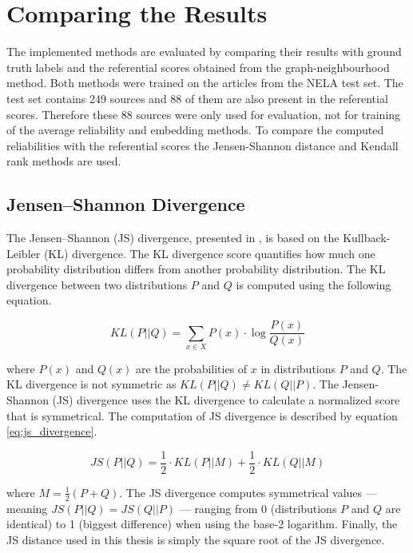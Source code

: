 \section{Comparing the Results}
The implemented methods are evaluated by comparing their results with ground truth labels and the referential scores obtained from the graph-neighbourhood method. Both methods were trained on the articles from the NELA test set. The test set contains 249 sources and 88 of them are also present in the referential scores. Therefore these 88 sources were only used for evaluation, not for training of the average reliability and embedding methods. To compare the computed reliabilities with the referential scores the Jensen-Shannon distance and Kendall rank methods are used. 

\subsection*{Jensen–Shannon Divergence}
The Jensen–Shannon (JS) divergence, presented in \cite{js_divergence}, is based on the Kullback-Leibler (KL) divergence. The KL divergence score quantifies how much one probability distribution differs from another probability distribution. The KL divergence between two distributions $P$ and $Q$ is computed using the following equation.

\begin{equation}
    KL(P || Q) = \sum_{x \in X} P(x) \cdot \operatorname{log}\frac{P(x)}{Q(x)}
    \label{eq:kl_divergence}
\end{equation}

where $P(x)$ and $Q(x)$ are the probabilities of $x$ in distributions $P$ and $Q$. The KL divergence is not symmetric as $KL(P||Q) \neq KL(Q||P)$. The Jensen-Shannon (JS) divergence uses the KL divergence to calculate a normalized score that is symmetrical. The computation of JS divergence is described by equation \ref{eq:js_divergence}. 

\begin{equation}
    JS(P||Q) = \frac{1}{2} \cdot KL(P||M) + \frac{1}{2} \cdot KL(Q||M) 
    \label{eq:js_divergence}
\end{equation}

where $M = \frac{1}{2} (P+Q)$. The JS divergence computes symmetrical values --- meaning $JS(P||Q) = JS(Q||P)$ --- ranging from 0 (distributions $P$ and $Q$ are identical) to 1 (biggest difference) when using the base-2 logarithm. Finally, the JS distance used in this thesis is simply the square root of the JS divergence.


